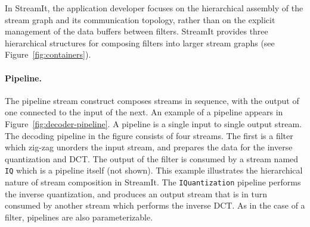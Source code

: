 \begin{figure}[t]
\end{figure}

In StreamIt, the application developer focuses on the hierarchical
assembly of the stream graph and its communication topology, rather
than on the  explicit management of the data buffers between filters.
StreamIt provides three hierarchical structures for composing filters
into larger stream graphs (see Figure~\ref{fig:containers}).

\paragraph{Pipeline.}
The pipeline stream construct composes streams in sequence, with
the output of one connected to the input of the next.  An example of a
pipeline appears in Figure~\ref{fig:decoder-pipeline}. A pipeline is a
single input to single output stream. The decoding pipeline in the
figure consists of four streams. The first is a filter which zig-zag
unorders the input stream, and prepares the data for the inverse
quantization and DCT. The output of the filter is consumed by a stream
named {\tt IQ} which is a pipeline itself (not shown). This example
illustrates the hierarchical nature of stream composition in
StreamIt. The {\tt IQuantization} pipeline performs the inverse quantization, and
produces an output stream that is in turn consumed by another stream
which performs the inverse DCT. As in the case of a filter, pipelines
are also parameterizable.

